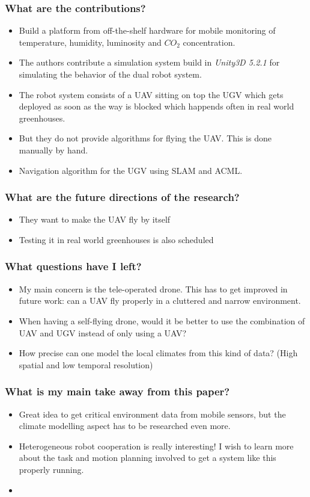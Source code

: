 \documentclass{article}
\begin{document}
\subsubsection*{What are the contributions?}
\begin{itemize}
    \item Build a platform from off-the-shelf hardware for mobile monitoring of temperature, humidity, luminosity and $CO_2$ concentration.
    \item The authors contribute a simulation system build in \emph{Unity3D 5.2.1} for simulating the behavior of the dual robot system. 
    \item The robot system consists of a UAV sitting on top the UGV which gets deployed as soon as the way is blocked which happends often in real world greenhouses.
    \item But they do not provide algorithms for flying the UAV. This is done manually by hand.
    \item Navigation algorithm for the UGV using SLAM and ACML.
\end{itemize}
\subsubsection*{What are the future directions of the research?}
\begin{itemize}
    \item They want to make the UAV fly by itself
    \item Testing it in real world greenhouses is also scheduled
\end{itemize}
\subsubsection*{What questions have I left?}
\begin{itemize}
    \item My main concern is the tele-operated drone. This has to get improved in future work: can a UAV fly properly in a cluttered and narrow environment.
    \item When having a self-flying drone, would it be better to use the combination of UAV and UGV instead of only using a UAV?
    \item How precise can one model the local climates from this kind of data? (High spatial and low temporal resolution)
\end{itemize}
\subsubsection*{What is my main take away from this paper?}
\begin{itemize}
    \item Great idea to get critical environment data from mobile sensors, but the climate modelling aspect has to be researched even more.
    \item Heterogeneous robot cooperation is really interesting! I wish to learn more about the task and motion planning involved to get a system like this properly running.
    \item 
\end{itemize}
\end{document}
